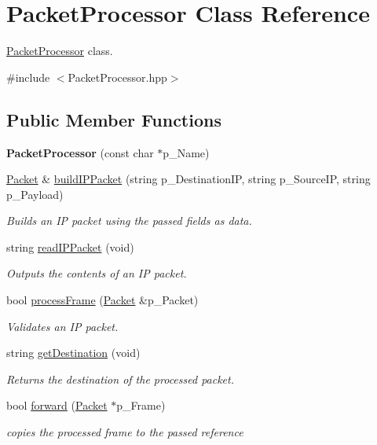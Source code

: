 \hypertarget{classPacketProcessor}{\section{Packet\-Processor Class Reference}
\label{classPacketProcessor}
}


\hyperlink{classPacketProcessor}{Packet\-Processor} class.  




{\ttfamily \#include $<$Packet\-Processor.\-hpp$>$}

\subsection*{Public Member Functions}
\begin{DoxyCompactItemize}
\item 
\hypertarget{classPacketProcessor_a291d46ed0984263adeafb8468fcc73c6}{{\bfseries Packet\-Processor} (const char $\ast$p\-\_\-\-Name)}\label{classPacketProcessor_a291d46ed0984263adeafb8468fcc73c6}

\item 
\hyperlink{classPacket}{Packet} \& \hyperlink{classPacketProcessor_a2e64f01458bcc7fbe2b1fd922e1e4340}{build\-I\-P\-Packet} (string p\-\_\-\-Destination\-I\-P, string p\-\_\-\-Source\-I\-P, string p\-\_\-\-Payload)
\begin{DoxyCompactList}\small\item\em Builds an I\-P packet using the passed fields as data. \end{DoxyCompactList}\item 
string \hyperlink{classPacketProcessor_aa47781f9d17becf245930e46470261ff}{read\-I\-P\-Packet} (void)
\begin{DoxyCompactList}\small\item\em Outputs the contents of an I\-P packet. \end{DoxyCompactList}\item 
bool \hyperlink{classPacketProcessor_af9e66fdf37bfe00a3c71497dda969a56}{process\-Frame} (\hyperlink{classPacket}{Packet} \&p\-\_\-\-Packet)
\begin{DoxyCompactList}\small\item\em Validates an I\-P packet. \end{DoxyCompactList}\item 
string \hyperlink{classPacketProcessor_ac998c53191d575509fc2aa5298a1f90b}{get\-Destination} (void)
\begin{DoxyCompactList}\small\item\em Returns the destination of the processed packet. \end{DoxyCompactList}\item 
bool \hyperlink{classPacketProcessor_a631b0bd17d767c2d822cec00642402e5}{forward} (\hyperlink{classPacket}{Packet} $\ast$p\-\_\-\-Frame)
\begin{DoxyCompactList}\small\item\em copies the processed frame to the passed reference \end{DoxyCompactList}\end{DoxyCompactItemize}


